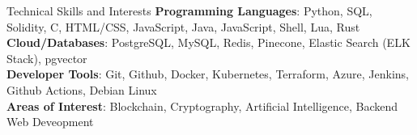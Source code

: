 \documentclass{resume} %
\begin{document}

\begin{rSection}{Technical Skills and Interests}
	\textbf{Programming Languages}{: Python, SQL, Solidity, C, HTML/CSS, JavaScript, Java, JavaScript, Shell, Lua, Rust} \\
	\textbf{Cloud/Databases}{: PostgreSQL, MySQL, Redis, Pinecone, Elastic Search (ELK Stack), pgvector} \\
	\textbf{Developer Tools}{: Git, Github, Docker, Kubernetes, Terraform, Azure, Jenkins, Github Actions, Debian Linux} \\
	\textbf{Areas of Interest}{: Blockchain, Cryptography, Artificial Intelligence, Backend Web Deveopment}
\end{rSection}
\end{document}
